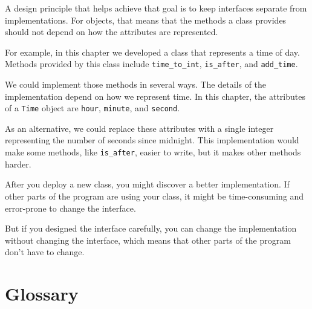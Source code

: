 A design principle that helps achieve that goal is to keep
interfaces separate from implementations.  For objects, that means
that the methods a class provides should not depend on how the
attributes are represented.

For example, in this chapter we developed a class that represents
a time of day.  Methods provided by this class include
\verb"time_to_int", \verb"is_after", and \verb"add_time".

We could implement those methods in several ways.  The details of the
implementation depend on how we represent time.  In this chapter, the
attributes of a {\tt Time} object are {\tt hour}, {\tt minute}, and
{\tt second}.

As an alternative, we could replace these attributes with
a single integer representing the number of seconds
since midnight.  This implementation would make some methods,
like \verb"is_after", easier to write, but it makes other methods
harder.

After you deploy a new class, you might discover a better
implementation.  If other parts of the program are using your
class, it might be time-consuming and error-prone to change the
interface.

But if you designed the interface carefully, you can
change the implementation without changing the interface, which
means that other parts of the program don't have to change.


\section{Glossary}

